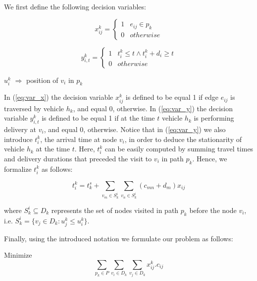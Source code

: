 \documentclass[conference]{IEEEtran}
\begin{document}
We first define the following decision variables:

\begin{equation}
\label{eq:var_x}
x^k_{ij}=\begin{cases} 
      1 & e_{ij} \in p_k \\
      0 & otherwise 
   \end{cases}
\end{equation}

\begin{equation}
\label{eq:var_y}
y^k_{i,t}=\begin{cases} 
      1 & t^k_i \le t \wedge t^k_i + d_i \ge t \\
      0 & otherwise 
   \end{cases}
\end{equation}

\begin{center}
$u^k_i$ $\Rightarrow$ position of $v_i$ in $p_k$
\end{center}

In (\ref{eq:var_x}) the decision variable $ x^k_{ij} $ is defined to be equal 1 if edge $ e_{ij} $ is traversed by vehicle $ h_k $, and equal 0, otherwise. In (\ref{eq:var_y}) the decision variable $ y^k_{i,t} $ is defined to be equal 1 if at the time $ t $ vehicle $ h_k $ is performing delivery at $v_i $, and equal 0, otherwise. Notice that in (\ref{eq:var_y}) we also introduce $ t^k_i $, the arrival time at node $ v_i $, in order to deduce the stationarity of vehicle $ h_k $ at the time $ t $. Here, $ t^k_i $ can be easily computed by summing travel times and delivery durations that preceded the visit to $ v_i $ in path $ p_k $. Hence, we formalize $ t^k_i $ as follows:

\begin{equation}
\label{eq:arrival_time}
t^k_i = t_k^s + \sum_{v_m \in S_k^i} \sum_{v_n \in S_k^i} (c_{mn} + d_m)x_{ij}
\end{equation}

where $ S_k^i \subseteq D_k $ represents the set of nodes visited in path $ p_k $ before the node $ v_i $, i.e. $ S_k^i = \{ v_j \in D_k : u_j^k \le u_i^k \} $.

Finally, using the introduced notation we formulate our problem as follows:

Minimize
\begin{equation}
\label{eq:objective}
\sum_{p_k \in P}\sum_{v_i\in D_k}\sum_{v_j \in D_k}x^k_{ij}.c_{ij}
\end{equation}
\end{document}
